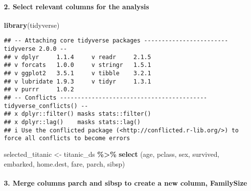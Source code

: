 \documentclass[
]{article}
\newenvironment{Shaded}{\begin{snugshade}}{\end{snugshade}}
\newcommand{\DecValTok}[1]{\textcolor[rgb]{0.00,0.00,0.81}{#1}}
\newcommand{\FunctionTok}[1]{\textcolor[rgb]{0.13,0.29,0.53}{\textbf{#1}}}
\newcommand{\NormalTok}[1]{#1}
\newcommand{\OtherTok}[1]{\textcolor[rgb]{0.56,0.35,0.01}{#1}}
\newcommand{\SpecialCharTok}[1]{\textcolor[rgb]{0.81,0.36,0.00}{\textbf{#1}}}
\begin{document}
\paragraph{2. Select relevant columns for the
analysis}\label{select-relevant-columns-for-the-analysis}

\begin{Shaded}
\begin{Highlighting}[]
\FunctionTok{library}\NormalTok{(tidyverse)}
\end{Highlighting}
\end{Shaded}

\begin{verbatim}
## -- Attaching core tidyverse packages ------------------------ tidyverse 2.0.0 --
## v dplyr     1.1.4     v readr     2.1.5
## v forcats   1.0.0     v stringr   1.5.1
## v ggplot2   3.5.1     v tibble    3.2.1
## v lubridate 1.9.3     v tidyr     1.3.1
## v purrr     1.0.2     
## -- Conflicts ------------------------------------------ tidyverse_conflicts() --
## x dplyr::filter() masks stats::filter()
## x dplyr::lag()    masks stats::lag()
## i Use the conflicted package (<http://conflicted.r-lib.org/>) to force all conflicts to become errors
\end{verbatim}

\begin{Shaded}
\begin{Highlighting}[]
\NormalTok{selected\_titanic }\OtherTok{\textless{}{-}}\NormalTok{ titanic\_ds }\SpecialCharTok{\%\textgreater{}\%}
  \FunctionTok{select}\NormalTok{ (age, pclass, sex, survived, embarked, home.dest, fare, parch, sibsp)}
\end{Highlighting}
\end{Shaded}

\paragraph{3. Merge columns parch and sibsp to create a new column,
FamilySize}\label{merge-columns-parch-and-sibsp-to-create-a-new-column-familysize}

\begin{Shaded}
\end{Shaded}
\end{document}
